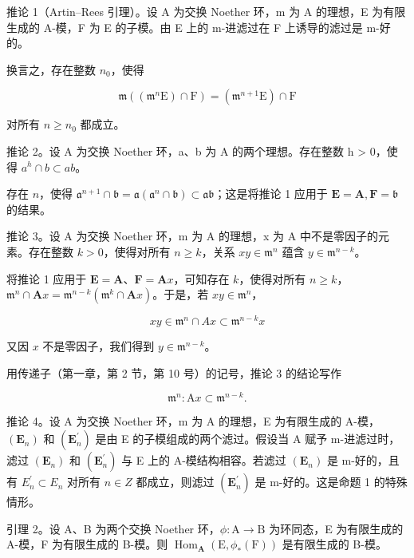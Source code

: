 推论 1（Artin–Rees 引理）。设 A 为交换 Noether 环，m 为 A 的理想，E 为有限生成的 A-模，F 为 E 的子模。由 E 上的 m-进滤过在 F 上诱导的滤过是 m-好的。

换言之，存在整数 \(n_{0}\)，使得

\[
\mathfrak {m} ((\mathfrak {m} ^ {n} \mathrm{E}) \cap \mathrm{F}) = (\mathfrak {m} ^ {n + 1} \mathrm{E}) \cap \mathrm{F}\tag{1}
\]

对所有 \(n \geqslant n_0\) 都成立。

推论 2。设 A 为交换 Noether 环，a、b 为 A 的两个理想。存在整数 h \textgreater{} 0，使得 \(a^{h} \cap b \subset ab\)。

存在 \(n\)，使得 \(\mathfrak{a}^{n+1} \cap \mathfrak{b} = \mathfrak{a}(\mathfrak{a}^n \cap \mathfrak{b}) \subset \mathfrak{ab}\)；这是将推论 1 应用于 \(\mathbf{E} = \mathbf{A}, \mathbf{F} = \mathfrak{b}\) 的结果。

推论 3。设 A 为交换 Noether 环，m 为 A 的理想，x 为 A 中不是零因子的元素。存在整数 \(k > 0\)，使得对所有 \(n \geqslant k\)，关系 \(xy \in \mathfrak{m}^n\) 蕴含 \(y \in \mathfrak{m}^{n - k}\)。

将推论 1 应用于 \(\mathbf{E} = \mathbf{A}\)、\(\mathbf{F} = \mathbf{A}x\)，可知存在 \(k\)，使得对所有 \(n \geqslant k\)，\(\mathfrak{m}^n \cap \mathbf{A}x = \mathfrak{m}^{n - k}(\mathfrak{m}^k \cap \mathbf{A}x)\)。于是，若 \(xy \in \mathfrak{m}^n\)，

\[
x y \in \mathfrak {m} ^ {n} \cap A x \subset \mathfrak {m} ^ {n - k} x
\]

又因 \(x\) 不是零因子，我们得到 \(y \in \mathfrak{m}^{n - k}\)。

用传递子（第一章，第 2 节，第 10 号）的记号，推论 3 的结论写作

\[
\mathfrak {m} ^ {n}: \mathrm{A} x \subset \mathfrak {m} ^ {n - k}.\tag{2}
\]

推论 4。设 A 为交换 Noether 环，m 为 A 的理想，E 为有限生成的 A-模，\((\mathbf{E}_{n})\) 和 \((\mathbf{E}_{n}^{\prime})\) 是由 E 的子模组成的两个滤过。假设当 A 赋予 m-进滤过时，滤过 \((\mathbf{E}_{n})\) 和 \((\mathbf{E}_{n}^{\prime})\) 与 E 上的 A-模结构相容。若滤过 \((\mathbf{E}_{n})\) 是 m-好的，且有 \(E_{n}^{\prime} \subset E_{n}\) 对所有 \(n \in Z\) 都成立，则滤过 \((\mathbf{E}_{n}^{\prime})\) 是 m-好的。这是命题 1 的特殊情形。

引理 2。设 A、B 为两个交换 Noether 环，\(\phi: \mathrm{A} \to \mathrm{B}\) 为环同态，E 为有限生成的 A-模，F 为有限生成的 B-模。则 \(\operatorname{Hom}_{\mathbf{A}}(\mathrm{E}, \phi_*(\mathrm{F}))\) 是有限生成的 B-模。

